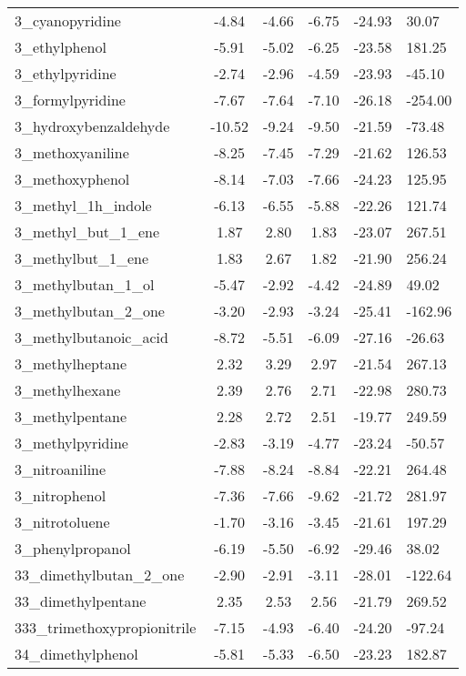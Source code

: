 \documentclass{amsart}
\begin{document}
\begin{longtable}{L|C|C|C|X|X}
3\_cyanopyridine & -4.84 & -4.66 & -6.75 & -24.93 & 30.07 \\ 
3\_ethylphenol & -5.91 & -5.02 & -6.25 & -23.58 & 181.25 \\ 
3\_ethylpyridine & -2.74 & -2.96 & -4.59 & -23.93 & -45.10 \\ 
3\_formylpyridine & -7.67 & -7.64 & -7.10 & -26.18 & -254.00 \\ 
3\_hydroxybenzaldehyde & -10.52 & -9.24 & -9.50 & -21.59 & -73.48 \\ 
3\_methoxyaniline & -8.25 & -7.45 & -7.29 & -21.62 & 126.53 \\ 
3\_methoxyphenol & -8.14 & -7.03 & -7.66 & -24.23 & 125.95 \\ 
3\_methyl\_1h\_indole & -6.13 & -6.55 & -5.88 & -22.26 & 121.74 \\ 
3\_methyl\_but\_1\_ene & 1.87 & 2.80 & 1.83 & -23.07 & 267.51 \\ 
3\_methylbut\_1\_ene & 1.83 & 2.67 & 1.82 & -21.90 & 256.24 \\ 
3\_methylbutan\_1\_ol & -5.47 & -2.92 & -4.42 & -24.89 & 49.02 \\ 
3\_methylbutan\_2\_one & -3.20 & -2.93 & -3.24 & -25.41 & -162.96 \\ 
3\_methylbutanoic\_acid & -8.72 & -5.51 & -6.09 & -27.16 & -26.63 \\ 
3\_methylheptane & 2.32 & 3.29 & 2.97 & -21.54 & 267.13 \\ 
3\_methylhexane & 2.39 & 2.76 & 2.71 & -22.98 & 280.73 \\ 
3\_methylpentane & 2.28 & 2.72 & 2.51 & -19.77 & 249.59 \\ 
3\_methylpyridine & -2.83 & -3.19 & -4.77 & -23.24 & -50.57 \\ 
3\_nitroaniline & -7.88 & -8.24 & -8.84 & -22.21 & 264.48 \\ 
3\_nitrophenol & -7.36 & -7.66 & -9.62 & -21.72 & 281.97 \\ 
3\_nitrotoluene & -1.70 & -3.16 & -3.45 & -21.61 & 197.29 \\ 
3\_phenylpropanol & -6.19 & -5.50 & -6.92 & -29.46 & 38.02 \\ 
33\_dimethylbutan\_2\_one & -2.90 & -2.91 & -3.11 & -28.01 & -122.64 \\ 
33\_dimethylpentane & 2.35 & 2.53 & 2.56 & -21.79 & 269.52 \\ 
333\_trimethoxypropionitrile & -7.15 & -4.93 & -6.40 & -24.20 & -97.24 \\ 
34\_dimethylphenol & -5.81 & -5.33 & -6.50 & -23.23 & 182.87 \\ 

\end{longtable}
\end{document}
